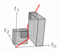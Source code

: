 \documentclass[orivec]{llncs} \usepackage[T1]{fontenc}
\begin{document}
{\begin{example}
\[  \begin{tikzpicture}[line join=round,opacity=0.7]
\draw[arrows=->](.786,-.786)--(.435,-.115);
\draw[line width=0.5mm,color=red](1.402,.316)--(2.042,1.461);
\filldraw[fill=lightgray](1.421,-.18)--(1.723,-.164)--(1.819,1.061)--(1.5,1.05)--cycle;
\filldraw[fill=lightgray](2.203,-.696)--(2.345,.703)--(1.819,1.061)--(1.723,-.164)--cycle;
\filldraw[fill=lightgray](1.855,-.718)--(2.203,-.696)--(1.723,-.164)--(1.421,-.18)--cycle;
\filldraw[fill=gray](1.908,.652)--(1.935,.982)--(1.819,1.061)--(1.794,.743)--cycle;
\filldraw[fill=gray](1.583,.639)--(1.908,.652)--(1.794,.743)--(1.479,.73)--cycle;
\filldraw[fill=gray](1.479,.73)--(1.794,.743)--(1.819,1.061)--(1.5,1.05)--cycle;
\filldraw[fill=gray](1.583,.639)--(1.908,.652)--(1.935,.982)--(1.605,.97)--cycle;
\filldraw[fill=lightgray](1.855,-.718)--(1.976,.687)--(1.5,1.05)--(1.421,-.18)--cycle;
\draw[line width=0.5mm,color=red](1.41,.245)--(1.402,.316);
\draw[line width=0.5mm,color=red](1.46,-.24)--(1.41,.245);
\filldraw[fill=gray](1.583,.639)--(1.605,.97)--(1.5,1.05)--(1.479,.73)--cycle;
\filldraw[fill=gray](1.605,.97)--(1.935,.982)--(1.819,1.061)--(1.5,1.05)--cycle;
\filldraw[fill=lightgray](1.976,.687)--(2.345,.703)--(1.819,1.061)--(1.5,1.05)--cycle;
\filldraw[fill=gray](1.416,-.263)--(1.437,.072)--(1.333,.192)--(1.314,-.133)--cycle;
\filldraw[fill=lightgray](1.395,-.589)--(1.437,.072)--(1.333,.192)--(1.295,-.448)--cycle;
\filldraw[fill=lightgray](.63,-.487)--(1.295,-.448)--(1.333,.192)--(.649,.158)--cycle;
\filldraw[fill=lightgray](.705,-.631)--(1.395,-.589)--(1.295,-.448)--(.63,-.487)--cycle;
\filldraw[fill=lightgray](.705,-.631)--(.727,.037)--(.649,.158)--(.63,-.487)--cycle;
\filldraw[fill=gray](1.068,-.283)--(1.416,-.263)--(1.314,-.133)--(.978,-.151)--cycle;
\filldraw[fill=gray](.978,-.151)--(1.314,-.133)--(1.333,.192)--(.993,.175)--cycle;
\filldraw[fill=gray](1.068,-.283)--(1.084,.055)--(.993,.175)--(.978,-.151)--cycle;
\filldraw[fill=gray](1.084,.055)--(1.437,.072)--(1.333,.192)--(.993,.175)--cycle;
\filldraw[fill=lightgray](.727,.037)--(1.437,.072)--(1.333,.192)--(.649,.158)--cycle;
\filldraw[fill=lightgray](.705,-.631)--(1.395,-.589)--(1.437,.072)--(.727,.037)--cycle;
\filldraw[fill=gray](1.068,-.283)--(1.416,-.263)--(1.437,.072)--(1.084,.055)--cycle;
\draw[line width=0.5mm,color=red](1.47,-.332)--(1.46,-.24);
\draw[arrows=->](.786,-.786)--(2.547,-.674);
\filldraw[fill=lightgray](1.855,-.718)--(2.203,-.696)--(2.345,.703)--(1.976,.687)--cycle;
\draw[line width=0.5mm,color=red](.786,-.786)--(1.47,-.332);
\draw[arrows=->](.786,-.786)--(.853,1.028);
\draw (2.786,-.659) node {$t_0$};\draw (.86,1.226) node {$t_1$};\draw (.326,.094) node {$t_2$};\end{tikzpicture}   \hspace{-1ex}
\]
\end{example}}
\end{document}
